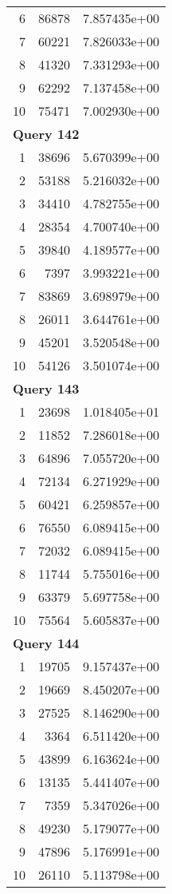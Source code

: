 \begin{longtable}[{p}]{@{}rrp{}@{}}
6 & 86878 & 7.857435e+00 \\
7 & 60221 & 7.826033e+00 \\
8 & 41320 & 7.331293e+00 \\
9 & 62292 & 7.137458e+00 \\
10 & 75471 & 7.002930e+00 \\
\midrule
\multicolumn{3}{l}{\bfseries Query 142} \\
1 & 38696 & 5.670399e+00 \\
2 & 53188 & 5.216032e+00 \\
3 & 34410 & 4.782755e+00 \\
4 & 28354 & 4.700740e+00 \\
5 & 39840 & 4.189577e+00 \\
6 & 7397 & 3.993221e+00 \\
7 & 83869 & 3.698979e+00 \\
8 & 26011 & 3.644761e+00 \\
9 & 45201 & 3.520548e+00 \\
10 & 54126 & 3.501074e+00 \\
\midrule
\multicolumn{3}{l}{\bfseries Query 143} \\
1 & 23698 & 1.018405e+01 \\
2 & 11852 & 7.286018e+00 \\
3 & 64896 & 7.055720e+00 \\
4 & 72134 & 6.271929e+00 \\
5 & 60421 & 6.259857e+00 \\
6 & 76550 & 6.089415e+00 \\
7 & 72032 & 6.089415e+00 \\
8 & 11744 & 5.755016e+00 \\
9 & 63379 & 5.697758e+00 \\
10 & 75564 & 5.605837e+00 \\
\midrule
\multicolumn{3}{l}{\bfseries Query 144} \\
1 & 19705 & 9.157437e+00 \\
2 & 19669 & 8.450207e+00 \\
3 & 27525 & 8.146290e+00 \\
4 & 3364 & 6.511420e+00 \\
5 & 43899 & 6.163624e+00 \\
6 & 13135 & 5.441407e+00 \\
7 & 7359 & 5.347026e+00 \\
8 & 49230 & 5.179077e+00 \\
9 & 47896 & 5.176991e+00 \\
10 & 26110 & 5.113798e+00 \\

\end{longtable}
